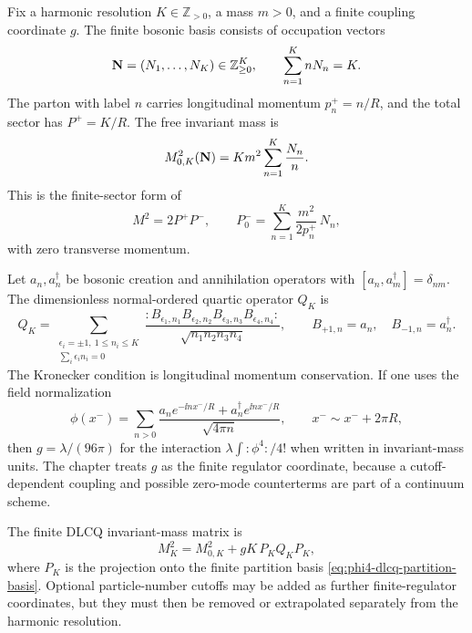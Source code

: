 \begin{construction}
\label{con:finite-scalar-phi4-dlcq-matrix}
Fix a harmonic resolution \(K\in\mathbb Z_{>0}\), a mass \(m>0\), and a
finite coupling coordinate \(g\).  The finite bosonic basis consists of
occupation vectors
\begin{equation}
  {\bf N}=(N_1,\ldots,N_K)\in\mathbb Z_{\ge0}^K,
  \qquad
  \sum_{n=1}^K nN_n=K .
  \label{eq:phi4-dlcq-partition-basis}
\end{equation}
The parton with label \(n\) carries longitudinal momentum \(p_n^+=n/R\), and
the total sector has \(P^+=K/R\).  The free invariant mass is
\begin{equation}
  M^2_{0,K}({\bf N})
  =
  K m^2\sum_{n=1}^K\frac{N_n}{n}.
  \label{eq:phi4-dlcq-free-mass}
\end{equation}
This is the finite-sector form of
\[
  M^2=2P^+P^-,
  \qquad
  P^-_0=\sum_{n=1}^K\frac{m^2}{2p_n^+}\,N_n,
\]
with zero transverse momentum.

Let \(a_n,a_n^\dagger\) be bosonic creation and annihilation operators with
\([a_n,a_m^\dagger]=\delta_{nm}\).  The dimensionless normal-ordered quartic
operator \(Q_K\) is
\begin{equation}
  Q_K
  =
  \sum_{\substack{\epsilon_i=\pm1,\ 1\le n_i\le K\\
                  \sum_i\epsilon_i n_i=0}}
  \frac{
    :B_{\epsilon_1,n_1}B_{\epsilon_2,n_2}
     B_{\epsilon_3,n_3}B_{\epsilon_4,n_4}:
  }{\sqrt{n_1n_2n_3n_4}},
  \qquad
  B_{+1,n}=a_n,\quad B_{-1,n}=a_n^\dagger .
  \label{eq:phi4-dlcq-quartic-operator}
\end{equation}
The Kronecker condition is longitudinal momentum conservation.  If one uses
the field normalization
\[
  \phi(x^-)
  =
  \sum_{n>0}
  \frac{a_ne^{-\ii n x^-/R}+a_n^\dagger e^{\ii n x^-/R}}{\sqrt{4\pi n}},
  \qquad x^-\sim x^-+2\pi R,
\]
then \(g=\lambda/(96\pi)\) for the interaction
\(\lambda\int:\phi^4:/4!\) when written in invariant-mass units.  The
chapter treats \(g\) as the finite regulator coordinate, because a
cutoff-dependent coupling and possible zero-mode counterterms are part of a
continuum scheme.

The finite DLCQ invariant-mass matrix is
\begin{equation}
  M^2_K
  =
  M^2_{0,K}
  +
  gK\,P_KQ_KP_K ,
  \label{eq:phi4-dlcq-finite-mass-matrix}
\end{equation}
where \(P_K\) is the projection onto the finite partition basis
\eqref{eq:phi4-dlcq-partition-basis}.  Optional particle-number cutoffs may
be added as further finite-regulator coordinates, but they must then be
removed or extrapolated separately from the harmonic resolution.
\end{construction}

